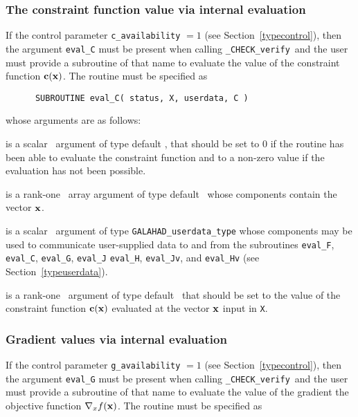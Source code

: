 \documentclass{galahad}
\newcommand{\packagename}{CHECK}
\newcommand{\fullpackagename}{\libraryname\_\packagename}
\newcommand{\solver}{{\tt \fullpackagename\_verify}}
\begin{document}
\subsubsection{The constraint function value via internal evaluation\label{cfv}}

If the control parameter {\tt c\_availability} $=1$ (see
Section~\ref{typecontrol}), then the argument
{\tt eval\_C} must be present when calling \solver\ and the
user must provide a subroutine of that name to evaluate the
value of the constraint function ${\mathbf{c}}({\mathbf{x}})$.
The routine must be specified as

\def\baselinestretch{0.8}
{\tt \begin{verbatim}
      SUBROUTINE eval_C( status, X, userdata, C ) \end{verbatim} }
\def\baselinestretch{1.0}
\noindent whose arguments are as follows:

\begin{description}
 is a scalar \intentout\ argument of type default \integer,
that should be set to 0 if the routine has been able to evaluate 
the constraint function
and to a non-zero value if the evaluation has not been possible.

 is a rank-one \intentin\ array argument of type default \realdp\
whose components contain the vector ${\mathbf{x}}$.

 is a scalar \intentinout\ argument of type 
{\tt GALAHAD\_userdata\_type} whose components may be used
to communicate user-supplied data to and from the
subroutines {\tt eval\_F}, {\tt eval\_C}, {\tt eval\_G}, {\tt eval\_J}
{\tt eval\_H}, {\tt eval\_Jv}, and {\tt eval\_Hv} 
(see Section~\ref{typeuserdata}). 

 is a rank-one \intentout\ argument of type default \realdp\
that should be set to the value of the constraint function ${\mathbf{c}}({\mathbf{x}})$
evaluated at the vector ${\mathbf{x}}$ input in {\tt X}.

\end{description}


\subsubsection{Gradient values via internal evaluation\label{gfv}}

If the control parameter {\tt g\_availability} $=1$ (see
Section~\ref{typecontrol}), then the argument {\tt eval\_G} must be
present when calling \solver\ and the
user must provide a subroutine of that name to evaluate the
value of the gradient the objective function $\nabla_x f({\mathbf{x}})$.
The routine must be specified as
\end{document}
